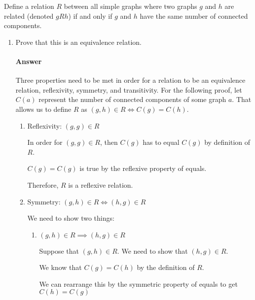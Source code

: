 \documentclass{article}
\begin{document}
 

Define a relation $R$ between all simple graphs where two graphs $g$ and $h$ are
related (denoted $gRh$) if and only if $g$ and $h$ have the same number of
connected components.

\begin{enumerate}

    \item Prove that this is an equivalence relation.

        \paragraph{Answer}

        Three properties need to be met in order for a relation to be an equivalence relation, reflexivity, symmetry, and transitivity.
        For the following proof, let $C(a)$ represent the number of connected components of some graph $a$. That allows us to define $R$ as $(g, h) \in R \iff C(g) = C(h)$.
        
        \begin{enumerate}
        \item Reflexivity: $(g, g) \in R$
        
        In order for $(g, g) \in R$, then $C(g)$ has to equal $C(g)$ by definition of $R$.
         
        $C(g) = C(g)$ is true by the reflexive property of equals.
        
        Therefore, $R$ is a reflexive relation.
        
        \item Symmetry: $(g, h) \in R \iff (h, g) \in R$
        
        We need to show two things:
        \begin{enumerate}
        \item $(g, h) \in R \implies (h, g) \in R$
        
        Suppose that $(g, h) \in R$. We need to show that $(h, g) \in R$.
        
        We know that $C(g) = C(h)$ by the definition of $R$.
        
        We can rearrange this by the symmetric property of equals to get $C(h) = C(g)$
       

\end{enumerate}
\end{enumerate}
\end{enumerate}
\end{document}
